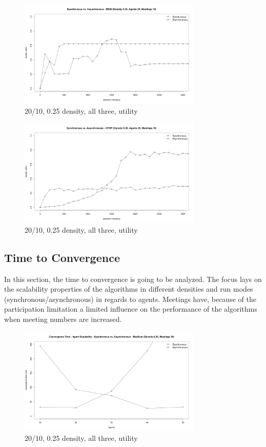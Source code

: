 \begin{figure}[H]
\centering
\includegraphics[width=330px]{graphics/experiments/static/st_12b}
\caption{20/10, 0.25 density, all three, utility}
\label{fig:st_12b}
\end{figure}
\begin{figure}[H]
\centering
\includegraphics[width=330px]{graphics/experiments/static/st_13}
\caption{20/10, 0.25 density, all three, utility}
\label{fig:st_13}
\end{figure}


\subsection{Time to Convergence}

In this section, the time to convergence is going to be analyzed. The focus lays on the scalability properties of the algorithms in different densities and run modes (synchronous/asynchronous) in regards to agents. Meetings have, because of the participation limitation a limited influence on the performance of the algorithms when meeting numbers are increased. 

\begin{figure}[H]
\centering
\includegraphics[width=330px]{graphics/experiments/static/st_14}
\caption{20/10, 0.25 density, all three, utility}
\label{fig:st_14}
\end{figure}

